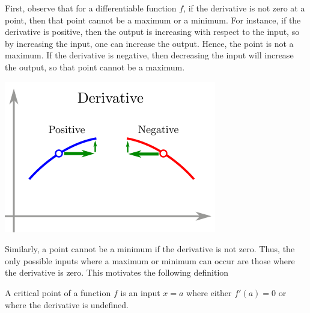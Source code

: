 \documentclass[twoside,openright,titlepage,a4paper]{book}
\begin{document}
\begin{sloppypar}
First, observe that for a differentiable function $f$, if the derivative is not zero at a point, then that point cannot be a maximum or a minimum. For instance, if the derivative is positive, then the output is increasing with respect to the input, so by increasing the input, one can increase the output. Hence, the point is not a maximum. If the derivative is negative, then decreasing the input will increase the output, so that point cannot be a maximum.
\begin{center}\includegraphics[scale=0.6]{MaxMin}\end{center}

Similarly, a point cannot be a minimum if the derivative is not zero. Thus, the only possible inputs where a maximum or minimum can occur are those where the derivative is zero. This motivates the following definition
\begin{definitionbox}[title=\textbf{Critical point}]
A critical point of a function $f$ is an input $x=a$ where either $f'(a)=0$ or where the derivative is undefined.
\end{definitionbox}


\end{sloppypar}
\end{document}
